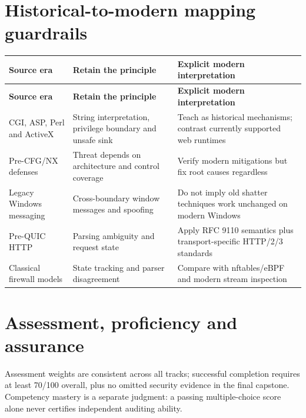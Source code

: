 \documentclass[10pt,letterpaper]{article}
\begin{document}
\section{Historical-to-modern mapping guardrails}
\begingroup\footnotesize\setlength\tabcolsep{3pt}
\begin{longtable}{>{\raggedright\arraybackslash}p{}>{\raggedright\arraybackslash}p{}>{\raggedright\arraybackslash}p{}}\toprule
\textbf{Source era} & \textbf{Retain the principle} & \textbf{Explicit modern interpretation}\\\midrule\endfirsthead
\toprule \textbf{Source era} & \textbf{Retain the principle} & \textbf{Explicit modern interpretation}\\\midrule\endhead
CGI, ASP, Perl and ActiveX & String interpretation, privilege boundary and unsafe sink & Teach as historical mechanisms; contrast currently supported web runtimes\\\midrule
Pre-CFG/NX defenses & Threat depends on architecture and control coverage & Verify modern mitigations but fix root causes regardless\\\midrule
Legacy Windows messaging & Cross-boundary window messages and spoofing & Do not imply old shatter techniques work unchanged on modern Windows\\\midrule
Pre-QUIC HTTP & Parsing ambiguity and request state & Apply RFC 9110 semantics plus transport-specific HTTP/2/3 standards\\\midrule
Classical firewall models & State tracking and parser disagreement & Compare with nftables/eBPF and modern stream inspection\\\midrule
\bottomrule\end{longtable}\endgroup
\section{Assessment, proficiency and assurance}
Assessment weights are consistent across all tracks; successful completion requires at least 70/100 overall, plus no omitted security evidence in the final capstone. Competency mastery is a separate judgment: a passing multiple-choice score alone never certifies independent auditing ability.
\end{document}
